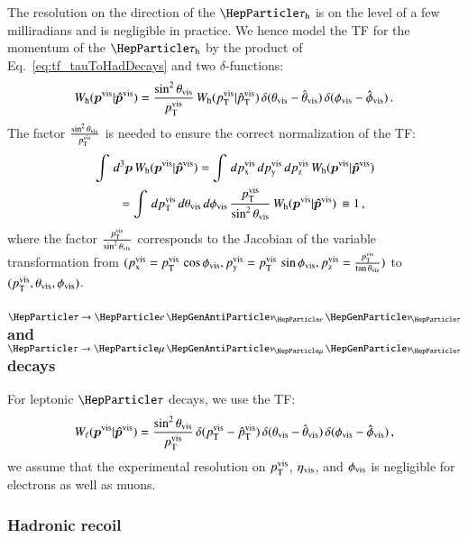 The resolution on the direction of the $\tauh$ is on the level
of a few milliradians and is negligible in practice.
We hence model the TF for the momentum of the $\tauh$ by the product of Eq.~\ref{eq:tf_tauToHadDecays} and two
$\delta$-functions:
\begin{equation}
W_{\textrm{h}}( \bm{p}^{\textrm{vis}} | \bm{\hat{p}}^{\textrm{vis}} ) =
 \frac{\sin^{2}\theta_{\textrm{vis}}}{p_{\textrm{T}}^{\textrm{vis}}} \, 
  W_{\textrm{h}}( p_{\textrm{T}}^{\textrm{vis}} | \hat{p}_{\textrm{T}}^{\textrm{vis}} ) \,
  \delta( \theta_{\textrm{vis}} - \hat{\theta}_{\textrm{vis}} ) \, 
  \delta( \phi_{\textrm{vis}} - \hat{\phi}_{\textrm{vis}} ) \, .
\label{eq:tf_tauToHadDecays}
\end{equation}
The factor $\frac{\sin^{2}\theta_{\textrm{vis}}}{p_{\textrm{T}}^{\textrm{vis}}}$ is needed
to ensure the correct normalization of the TF:
\begin{align}
& \int \, d^{3}\bm{p}  \, W_{\textrm{h}}( \bm{p}^{\textrm{vis}} | \bm{\hat{p}}^{\textrm{vis}} ) = \int \, dp_{\textrm{x}}^{\textrm{vis}} \, dp_{\textrm{y}}^{\textrm{vis}} \, dp_{\textrm{z}}^{\textrm{vis}} \, W_{\textrm{h}}( \bm{p}^{\textrm{vis}} | \bm{\hat{p}}^{\textrm{vis}} ) \nonumber \\
& \qquad = \int \, dp_{\textrm{T}}^{\textrm{vis}} \, d\theta_{\textrm{vis}} \, d\phi_{\textrm{vis}} \,
\frac{p_{\textrm{T}}^{\textrm{vis}}}{\sin^{2} \theta_{\textrm{vis}}} \, W_{\textrm{h}}( \bm{p}^{\textrm{vis}} | \bm{\hat{p}}^{\textrm{vis}} ) \, 
  \equiv 1 \, ,
\end{align}
where the factor $\frac{p_{\textrm{T}}^{\textrm{vis}}}{\sin^{2} \theta_{\textrm{vis}}}$ corresponds to the Jacobian of the variable transformation 
from $(p_{\textrm{x}}^{\textrm{vis}} = p_{\textrm{T}}^{\textrm{vis}} \, \cos\phi_{\textrm{vis}}, p_{\textrm{y}}^{\textrm{vis}} = p_{\textrm{T}}^{\textrm{vis}} \, \sin\phi_{\textrm{vis}}, p_{\textrm{z}}^{\textrm{vis}} = \frac{p_{\textrm{T}}^{\textrm{vis}}}{\tan\theta_{\textrm{vis}}})$ 
to $(p_{\textrm{T}}^{\textrm{vis}}, \theta_{\textrm{vis}}, \phi_{\textrm{vis}})$.

\subsubsection{$\Pgt \to \enunu$ and $\Pgt \to \mununu$ decays}
\label{sec:mem_TF_tauToLepDecays}

For leptonic $\Pgt$ decays,
we use the TF:
\begin{equation}
W_{\ell}( \bm{p}^{\textrm{vis}} | \bm{\hat{p}}^{\textrm{vis}} ) =  
 \frac{\sin^{2} \theta_{\textrm{vis}}}{p_{\textrm{T}}^{\textrm{vis}}} \, 
  \delta( p_{\textrm{T}}^{\textrm{vis}} - \hat{p}_{\textrm{T}}^{\textrm{vis}} ) \, 
  \delta( \theta_{\textrm{vis}} - \hat{\theta}_{\textrm{vis}} ) \, 
  \delta( \phi_{\textrm{vis}} - \hat{\phi}_{\textrm{vis}} ) \, ,
\label{eq:tf_tauToLepDecays}
\end{equation}
\ie we assume that the experimental resolution on $p_{\textrm{T}}^{\textrm{vis}}$,
$\eta_{\textrm{vis}}$, and $\phi_{\textrm{vis}}$ is negligible for electrons as well as
muons.


\subsubsection{Hadronic recoil}
\label{sec:mem_TF_hadRecoil}

